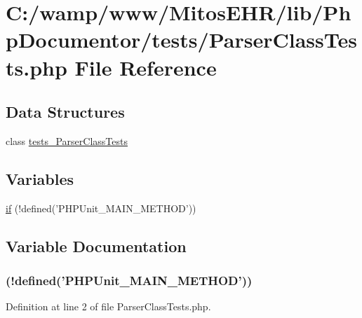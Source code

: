 \hypertarget{_parser_class_tests_8php}{\section{\-C\-:/wamp/www/\-Mitos\-E\-H\-R/lib/\-Php\-Documentor/tests/\-Parser\-Class\-Tests.php \-File \-Reference}
\label{_parser_class_tests_8php}
}
\subsection*{\-Data \-Structures}
\begin{DoxyCompactItemize}
\item 
class \hyperlink{classtests___parser_class_tests}{tests\-\_\-\-Parser\-Class\-Tests}
\end{DoxyCompactItemize}
\subsection*{\-Variables}
\begin{DoxyCompactItemize}
\item 
\hyperlink{_parser_class_tests_8php_a3120764b3588ecfc55f4be599e83d6f9}{if} (!defined('\-P\-H\-P\-Unit\-\_\-\-M\-A\-I\-N\-\_\-\-M\-E\-T\-H\-O\-D'))
\end{DoxyCompactItemize}


\subsection{\-Variable \-Documentation}
\hypertarget{_parser_class_tests_8php_a3120764b3588ecfc55f4be599e83d6f9}{
\subsubsection[{if}]{(!defined('\-P\-H\-P\-Unit\-\_\-\-M\-A\-I\-N\-\_\-\-M\-E\-T\-H\-O\-D'))}}\label{_parser_class_tests_8php_a3120764b3588ecfc55f4be599e83d6f9}


\-Definition at line 2 of file \-Parser\-Class\-Tests.\-php.

